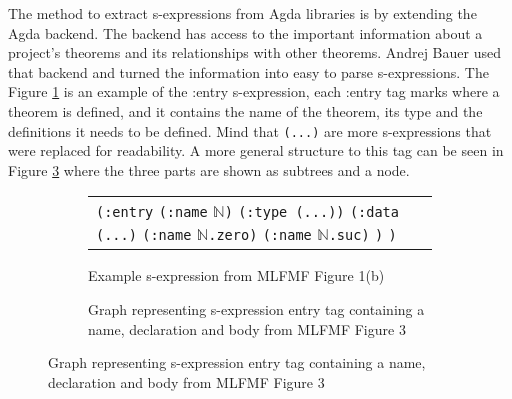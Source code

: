 The method to extract s-expressions from Agda libraries is by extending the
Agda backend. The backend has access to the important information about a
project's theorems and its relationships with other theorems. Andrej Bauer used
that backend and turned the information into easy to parse s-expressions. The
Figure \ref{fig:example-sexp} is an example of the :entry s-expression, each
:entry tag marks where a theorem is defined, and it contains the name of the
theorem, its type and the definitions it needs to be defined. Mind that
\texttt{(...)} are more s-expressions that were replaced for readability. A
more general structure to this tag can be seen in Figure \ref{fig:sexp-ast}
where the three parts are shown as subtrees and a node.

\begin{figure}[H]
  \begin{subfigure}[b]{0.40\textwidth}
    \centering
    \begin{tabular}{p{5cm}}
      \texttt{(:entry}\newline
      \hphantom{oo}\texttt{(:name} $\mathbb{N}$\texttt{)}\newline
      \hphantom{oo}\texttt{(:type (...))}\newline
      \hphantom{oo}\texttt{(:data}\newline
      \hphantom{oooo}\texttt{(...)}\newline
      \hphantom{oooo}\texttt{(:name} $\mathbb{N}$\texttt{.zero)}\newline
      \hphantom{oooo}\texttt{(:name} $\mathbb{N}$\texttt{.suc)}\newline
      \hphantom{oo}\texttt{)}\newline
      \texttt{)}
    \end{tabular}
    \caption{Example s-expression from MLFMF Figure 1(b) \cite{bauer2023mlfmf}}
    \label{fig:example-sexp}
  \end{subfigure} \hfill
  \begin{subfigure}[b]{0.50\textwidth}
    \centering
    \caption{Graph representing s-expression entry tag containing a name,
    declaration and body from MLFMF Figure 3 \cite{bauer2023mlfmf}}
    \label{fig:sexp-ast}
  \end{subfigure}
\end{figure}

